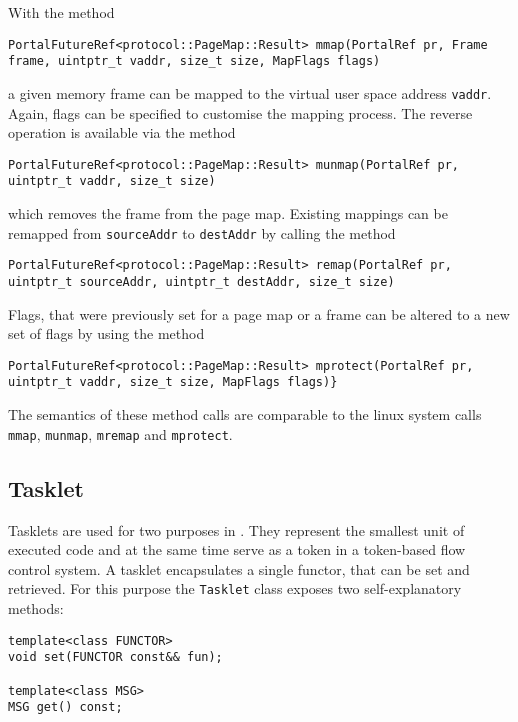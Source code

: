 With the method
\lstset{language=c++,numbers=none}
\begin{lstlisting}
PortalFutureRef<protocol::PageMap::Result> mmap(PortalRef pr, Frame frame, uintptr_t vaddr, size_t size, MapFlags flags)
\end{lstlisting}
\noindent a given memory frame can be mapped to the virtual user space address
\texttt{vaddr}. Again, flags can be specified to customise the mapping process.
The reverse operation is available via the method
\lstset{language=c++,numbers=none}
\begin{lstlisting}
PortalFutureRef<protocol::PageMap::Result> munmap(PortalRef pr, uintptr_t vaddr, size_t size)
\end{lstlisting}
\noindent which removes the frame from the page map.
Existing mappings can be remapped from \texttt{sourceAddr} to \texttt{destAddr}
by calling the method
\lstset{language=c++,numbers=none}
\begin{lstlisting}
PortalFutureRef<protocol::PageMap::Result> remap(PortalRef pr, uintptr_t sourceAddr, uintptr_t destAddr, size_t size)
\end{lstlisting}
Flags, that were previously set for a page map or a frame can be altered to a
new set of flags by using the method
\lstset{language=c++,numbers=none}
\begin{lstlisting}
PortalFutureRef<protocol::PageMap::Result> mprotect(PortalRef pr, uintptr_t vaddr, size_t size, MapFlags flags)}
\end{lstlisting}
The semantics of these method calls are comparable to the linux system calls
\texttt{mmap}, \texttt{munmap}, \texttt{mremap} and \texttt{mprotect}.


\subsection{Tasklet}
Tasklets are used for two purposes in \mythos. They represent the smallest unit
of executed code and at the same time serve as a token in a token-based flow
control system. A tasklet encapsulates a single functor, that can be set and
retrieved. For this purpose the \texttt{Tasklet} class exposes two
self-explanatory methods:

\lstset{language=c++}
\begin{lstlisting}
template<class FUNCTOR>
void set(FUNCTOR const&& fun);

template<class MSG>
MSG get() const;
\end{lstlisting}

